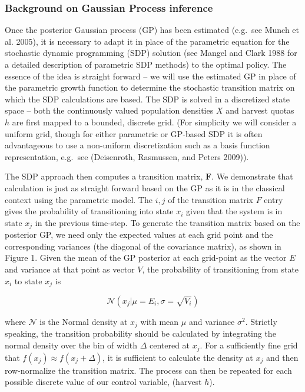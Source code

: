 \documentclass[author-year, review]{elsarticle} %
\begin{document}
\subsubsection{Background on Gaussian Process inference}

Once the posterior Gaussian process (GP) has been estimated (e.g.~see
Munch et al. 2005), it is necessary to adapt it in place of the
parametric equation for the stochastic dynamic programming (SDP)
solution (see Mangel and Clark 1988 for a detailed description of
parametric SDP methods) to the optimal policy. The essence of the idea
is straight forward -- we will use the estimated GP in place of the
parametric growth function to determine the stochastic transition matrix
on which the SDP calculations are based. The SDP is solved in a
discretized state space -- both the continuously valued population
densities $X$ and harvest quotas $h$ are first mapped to a bounded,
discrete grid. (For simplicity we will consider a uniform grid, though
for either parametric or GP-based SDP it is often advantageous to use a
non-uniform discretization such as a basis function representation,
e.g.~see (Deisenroth, Rasmussen, and Peters 2009)).

The SDP approach then computes a transition matrix, $\mathbf{F}$. We
demonstrate that calculation is just as straight forward based on the GP
as it is in the classical context using the parametric model. The
${i,j}$ of the transition matrix $F$ entry gives the probability of
transitioning into state $x_i$ given that the system is in state $x_j$
in the previous time-step. To generate the transition matrix based on
the posterior GP, we need only the expected values at each grid point
and the corresponding variances (the diagonal of the covariance matrix),
as shown in Figure 1. Given the mean of the GP posterior at each
grid-point as the vector $E$ and variance at that point as vector $V$,
the probability of transitioning from state $x_i$ to state $x_j$ is

\[\mathcal{N}\left(x_j \vert  \mu = E_i, \sigma = \sqrt{V_i}\right)\]

where $\mathcal{N}$ is the Normal density at $x_j$ with mean $\mu$ and
variance $\sigma^2$. Strictly speaking, the transition probability
should be calculated by integrating the normal density over the bin of
width $\Delta$ centered at $x_j$. For a sufficiently fine grid that
$f(x_j) \approx f(x_j + \Delta)$, it is sufficient to calculate the
density at $x_j$ and then row-normalize the transition matrix. The
process can then be repeated for each possible discrete value of our
control variable, (harvest $h$).
\end{document}
